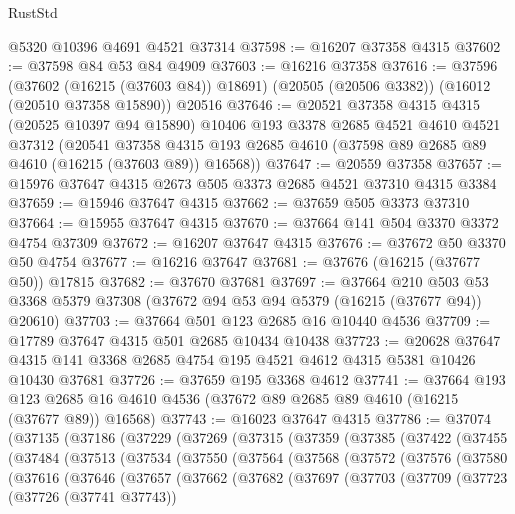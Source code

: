 \begin{lexlean}{RustStd}
\begin{coremodule}
    @5320
    @10396
    @4691
    @4521
    @37314
@37598 := @16207 @37358 @4315
@37602 := @37598 @84 @53 @84 @4909
@37603 := @16216 @37358
@37616 := @37596
    (@37602 (@16215 (@37603 @84)) @18691)
    (@20505 (@20506 @3382))
    (@16012 (@20510 @37358 @15890))
    @20516
@37646 := @20521
    @37358
    @4315
    @4315
    (@20525 @10397 @94 @15890)
    @10406
    @193
    @3378
    @2685
    @4521
    @4610
    @4521
    @37312
    (@20541 @37358 @4315 @193 @2685 @4610 (@37598 @89 @2685 @89 @4610 (@16215 (@37603 @89)) @16568))
@37647 := @20559 @37358
@37657 := @15976 @37647 @4315 @2673 @505 @3373 @2685 @4521 @37310 @4315 @3384
@37659 := @15946 @37647 @4315
@37662 := @37659 @505 @3373 @37310
@37664 := @15955 @37647 @4315
@37670 := @37664 @141 @504 @3370 @3372 @4754 @37309
@37672 := @16207 @37647 @4315
@37676 := @37672 @50 @3370 @50 @4754
@37677 := @16216 @37647
@37681 := @37676 (@16215 (@37677 @50)) @17815
@37682 := @37670 @37681
@37697 := @37664
    @210
    @503
    @53
    @3368
    @5379
    @37308
    (@37672 @94 @53 @94 @5379 (@16215 (@37677 @94)) @20610)
@37703 := @37664 @501 @123 @2685 @16 @10440 @4536
@37709 := @17789 @37647 @4315 @501 @2685 @10434 @10438
@37723 := @20628
    @37647
    @4315
    @141
    @3368
    @2685
    @4754
    @195
    @4521
    @4612
    @4315
    @5381
    @10426
    @10430
    @37681
@37726 := @37659 @195 @3368 @4612
@37741 := @37664
    @193
    @123
    @2685
    @16
    @4610
    @4536
    (@37672 @89 @2685 @89 @4610 (@16215 (@37677 @89)) @16568)
@37743 := @16023 @37647 @4315
@37786 := @37074
    (@37135
      (@37186
        (@37229
          (@37269
            (@37315
              (@37359
                (@37385
                  (@37422
                    (@37455
                      (@37484
                        (@37513
                          (@37534
                            (@37550
                              (@37564
                                (@37568
                                  (@37572
                                    (@37576
                                      (@37580
                                        (@37616
                                          (@37646
                                            (@37657
                                              (@37662
                                                (@37682
                                                  (@37697
                                                    (@37703
                                                      (@37709
                                                        (@37723
                                                          (@37726 (@37741 @37743))

\end{coremodule}
\end{lexlean}
